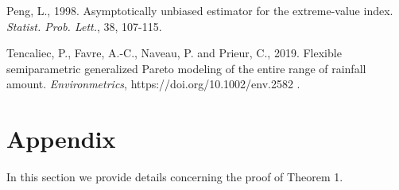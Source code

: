 \documentclass[twoside,leqno,11pt]{article}
\begin{document}
\begin{thebibliography}{99}
Peng, L., 1998. Asymptotically unbiased estimator for the extreme-value index. {\it Statist. Prob. Lett.}, 38, 107-115.


Tencaliec, P., Favre, A.-C., Naveau, P. and Prieur, C., 2019. Flexible semiparametric generalized Pareto modeling of the entire range of rainfall amount. {\it Environmetrics}, https://doi.org/10.1002/env.2582 .
\end{thebibliography}		


\section{Appendix}

\noindent
In this section we provide details concerning the proof of Theorem 1. 
\\
\end{document}

